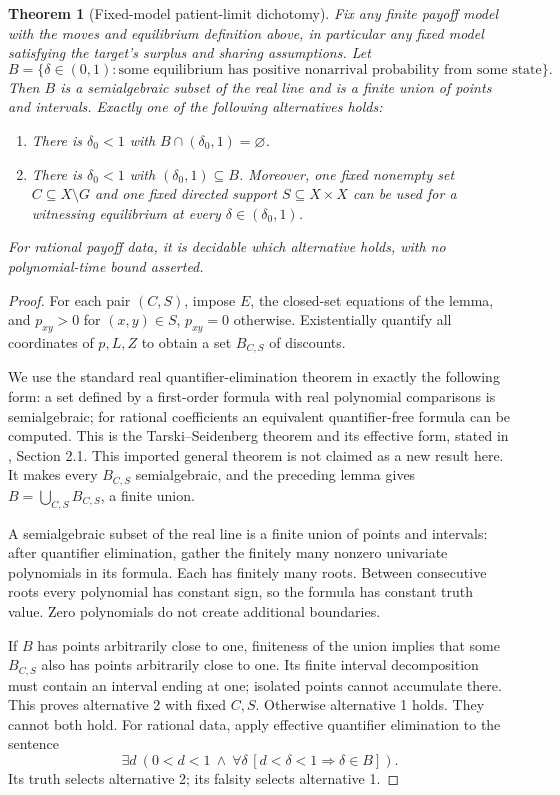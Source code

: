 \documentclass[11pt]{article}
\newtheorem{theorem}{Theorem}
\theoremstyle{definition}
\begin{document}
\begin{theorem}[Fixed-model patient-limit dichotomy]
Fix any finite payoff model with the moves and equilibrium definition above, in particular any fixed model satisfying the target's surplus and sharing assumptions. Let
\[
 B=\{\delta\in(0,1):\text{some equilibrium has positive nonarrival probability from some state}\}.
\]
Then $B$ is a semialgebraic subset of the real line and is a finite union of points and intervals. Exactly one of the following alternatives holds:
\begin{enumerate}
\item There is $\delta_0<1$ with $B\cap(\delta_0,1)=\varnothing$.
\item There is $\delta_0<1$ with $(\delta_0,1)\subseteq B$. Moreover, one fixed nonempty set $C\subseteq X\setminus G$ and one fixed directed support $S\subseteq X\times X$ can be used for a witnessing equilibrium at every $\delta\in(\delta_0,1)$.
\end{enumerate}
For rational payoff data, it is decidable which alternative holds, with no polynomial-time bound asserted.
\end{theorem}
\begin{proof}
For each pair $(C,S)$, impose $E$, the closed-set equations of the lemma, and $p_{xy}>0$ for $(x,y)\in S$, $p_{xy}=0$ otherwise. Existentially quantify all coordinates of $p,L,Z$ to obtain a set $B_{C,S}$ of discounts.

We use the standard real quantifier-elimination theorem in exactly the following form: a set defined by a first-order formula with real polynomial comparisons is semialgebraic; for rational coefficients an equivalent quantifier-free formula can be computed. This is the Tarski--Seidenberg theorem and its effective form, stated in \cite{basu}, Section 2.1. This imported general theorem is not claimed as a new result here. It makes every $B_{C,S}$ semialgebraic, and the preceding lemma gives $B=\bigcup_{C,S}B_{C,S}$, a finite union.

A semialgebraic subset of the real line is a finite union of points and intervals: after quantifier elimination, gather the finitely many nonzero univariate polynomials in its formula. Each has finitely many roots. Between consecutive roots every polynomial has constant sign, so the formula has constant truth value. Zero polynomials do not create additional boundaries.

If $B$ has points arbitrarily close to one, finiteness of the union implies that some $B_{C,S}$ also has points arbitrarily close to one. Its finite interval decomposition must contain an interval ending at one; isolated points cannot accumulate there. This proves alternative 2 with fixed $C,S$. Otherwise alternative 1 holds. They cannot both hold. For rational data, apply effective quantifier elimination to the sentence
\[
 \exists d\ (0<d<1\ \wedge\ \forall\delta\,[d<\delta<1\Rightarrow\delta\in B]).
\]
Its truth selects alternative 2; its falsity selects alternative 1.
\end{proof}
\end{document}
